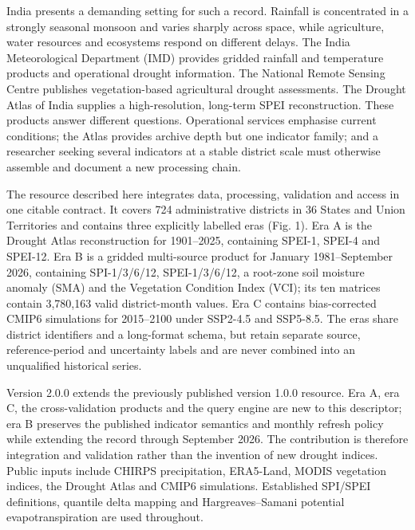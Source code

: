 \documentclass[11pt,a4paper]{article}
\begin{document}
India presents a demanding setting for such a record. Rainfall is concentrated in a strongly seasonal monsoon and varies sharply across space, while agriculture, water resources and ecosystems respond on different delays. The India Meteorological Department (IMD) provides gridded rainfall and temperature products\citep{Pai2014,Srivastava2009} and operational drought information. The National Remote Sensing Centre publishes vegetation-based agricultural drought assessments. The Drought Atlas of India supplies a high-resolution, long-term SPEI reconstruction\citep{Chuphal2024,ChuphalData2024}. These products answer different questions. Operational services emphasise current conditions; the Atlas provides archive depth but one indicator family; and a researcher seeking several indicators at a stable district scale must otherwise assemble and document a new processing chain.

The resource described here integrates data, processing, validation and access in one citable contract. It covers 724 administrative districts in 36 States and Union Territories and contains three explicitly labelled eras (Fig. 1). Era A is the Drought Atlas reconstruction for 1901--2025, containing SPEI-1, SPEI-4 and SPEI-12. Era B is a gridded multi-source product for January 1981--September 2026, containing SPI-1/3/6/12, SPEI-1/3/6/12, a root-zone soil moisture anomaly (SMA) and the Vegetation Condition Index (VCI); its ten matrices contain 3,780,163 valid district-month values. Era C contains bias-corrected CMIP6 simulations for 2015--2100 under SSP2-4.5 and SSP5-8.5. The eras share district identifiers and a long-format schema, but retain separate source, reference-period and uncertainty labels and are never combined into an unqualified historical series.

Version 2.0.0 extends the previously published version 1.0.0 resource\citep{DeshmukhV1Data2026}. Era A, era C, the cross-validation products and the query engine are new to this descriptor; era B preserves the published indicator semantics and monthly refresh policy while extending the record through September 2026. The contribution is therefore integration and validation rather than the invention of new drought indices. Public inputs include CHIRPS precipitation\citep{Funk2015}, ERA5-Land\citep{MunozSabater2021}, MODIS vegetation indices\citep{Didan2015}, the Drought Atlas\citep{ChuphalData2024} and CMIP6 simulations\citep{Eyring2016,ONeill2016}. Established SPI/SPEI definitions, quantile delta mapping\citep{Cannon2015} and Hargreaves--Samani potential evapotranspiration\citep{HargreavesSamani1985} are used throughout.
\end{document}

